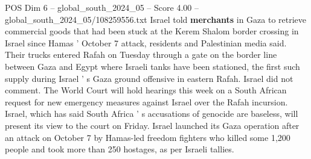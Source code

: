 \begin{textsample}{POS Dim 6 – global\_south\_2024\_05 – Score 4.00 – global\_south\_2024\_05/108259556.txt}
Israel told \textbf{merchants} in Gaza to retrieve commercial goods that had been stuck at the Kerem Shalom border crossing in Israel since Hamas ' October 7 attack, residents and Palestinian media said.
Their trucks entered Rafah on Tuesday through a gate on the border line between Gaza and Egypt where Israeli tanks have been stationed, the first such supply during Israel ' s Gaza ground offensive in eastern Rafah.
Israel did not comment.
The World Court will hold hearings this week on a South African request for new emergency measures against Israel over the Rafah incursion.
Israel, which has said South Africa ' s accusations of genocide are baseless, will present its view to the court on Friday.
Israel launched its Gaza operation after an attack on October 7 by Hamas-led freedom fighters who killed some 1,200 people and took more than 250 hostages, as per Israeli tallies.

\end{textsample}

